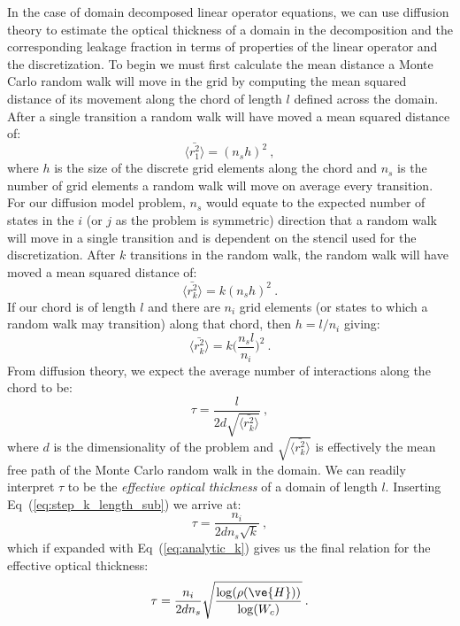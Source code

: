 \documentclass[preprint,11pt]{elsarticle}
\begin{document}
In the case of domain decomposed linear operator equations, we can use
diffusion theory to estimate the optical thickness of a domain in the
decomposition and the corresponding leakage fraction in terms of properties of
the linear operator and the discretization. To begin we must first calculate
the mean distance a Monte Carlo random walk will move in the grid by computing
the mean squared distance of its movement along the chord of length $l$
defined across the domain. After a single transition a random walk will have
moved a mean squared distance of:
\begin{equation}
  \langle \bar{r_1^2} \rangle = (n_s h)^2\:,
  \label{eq:step_1_length}
\end{equation}
where $h$ is the size of the discrete grid elements along the chord and $n_s$
is the number of grid elements a random walk will move on average every
transition. For our diffusion model problem, $n_s$ would equate to the
expected number of states in the $i$ (or $j$ as the problem is symmetric)
direction that a random walk will move in a single transition and is dependent on
the stencil used for the discretization. After $k$ transitions in the random
walk, the random walk will have moved a mean squared distance of:
\begin{equation}
  \langle \bar{r_k^2} \rangle = k (n_s h)^2\:.
  \label{eq:step_k_length}
\end{equation}
If our chord is of length $l$ and there are $n_i$ grid elements (or
states to which a random walk may transition) along that chord, then $h =
l / n_i$ giving:
\begin{equation}
  \langle \bar{r_k^2} \rangle = k \Bigg(\frac{n_s l}{n_i}\Bigg)^2\:.
  \label{eq:step_k_length_sub}
\end{equation}
From diffusion theory, we expect the average number of interactions
along the chord to be:
\begin{equation}
  \tau = \frac{l}{2 d \sqrt{\langle \bar{r_k^2} \rangle}}\:,
  \label{eq:optical_thickness_1}
\end{equation}
where $d$ is the dimensionality of the problem and $\sqrt{\langle
  \bar{r_k^2} \rangle}$ is effectively the mean free path of the Monte
Carlo random walk in the domain. We can readily interpret $\tau$ to be the
\textit{effective optical thickness} of a domain of length
$l$. Inserting Eq~(\ref{eq:step_k_length_sub}) we arrive at:
\begin{equation}
  \tau = \frac{n_i}{2 d n_s \sqrt{k}}\:,
  \label{eq:optical_thickness_2}
\end{equation}
which if expanded with Eq~(\ref{eq:analytic_k}) gives us the final
relation for the effective optical thickness:
\begin{equation}
  \tau = \frac{n_i}{2 d n_s}
  \sqrt{\frac{\log(\rho(\ve{H}))}{\log(W_c)}}\:.
  \label{eq:optical_thickness_3}
\end{equation}
\end{document}

